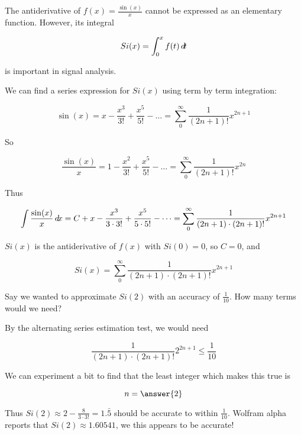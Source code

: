 \documentclass{ximera}
\begin{document}
\begin{example}
The antiderivative of $ f(x) =\frac{\sin(x)}{x}$ cannot be expressed as an elementary function.  However, its integral

\[
Si(x) = \int_0^x f(t) \mathop{}\!d\! t
\]

is important in signal analysis.

We can find a series expression for $Si(x)$ using term by term integration:

\[
\sin(x) = x-\frac{x^3}{3!}+\frac{x^5}{5!}-\dots = \sum_0^\infty \frac{1}{(2n+1)!} x^{2n+1}
\]

So 

\[
\frac{\sin(x)}{x} =1-\frac{x^2}{3!}+\frac{x^5}{5!}-\dots = \sum_0^\infty \frac{1}{(2n+1)!} x^{2n}
\]

Thus

\[
\int \frac{\sin(x)}{x} \mathop{}\!d\! x = C+x-\frac{x^3}{3 \cdot 3!}+\frac{x^5}{5 \cdot 5!}-\dots = \sum_0^\infty \frac{1}{(2n+1) \cdot (2n+1)!} x^{2n+1}
\]

$Si(x)$ is the antiderivative of $f(x)$ with $Si(0) = 0$, so  $C=0$, and 

\[
Si(x) = \sum_0^\infty \frac{1}{(2n+1) \cdot (2n+1)!} x^{2n+1}
\]

Say we wanted to approximate $Si(2)$ with an accuracy of $\frac{1}{10}$.  How many terms would we need?

By the alternating series estimation test, we would need

\[\frac{1}{(2n+1) \cdot (2n+1)!} 2^{2n+1} \leq  \frac{1}{10}\]

We can experiment a bit to find that the least integer which makes this true is 

\[
 n= \answer{2}
\]

Thus $Si(2) \approx 2-\frac{8}{3 \cdot 3!} = 1.\bar{5}$ should be accurate to within $\frac{1}{10}$.  Wolfram alpha reports that $Si(2) \approx 1.60541 $, we this appears to be accurate!
\end{example}
\end{document}

